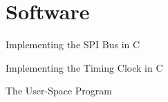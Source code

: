 \chapter{Software}

Implementing the SPI Bus in C

Implementing the Timing Clock in C

The User-Space Program


